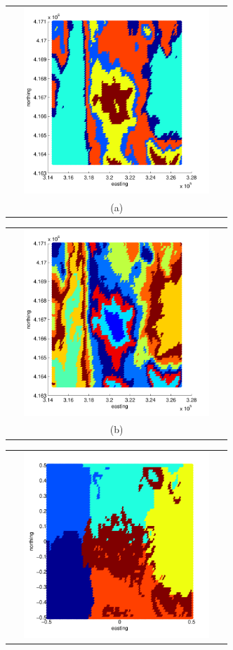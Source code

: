\documentclass[12pt,letterpaper]{article}
\begin{document}
\begin{figure}[H]
  \begin{minipage}[b]{0.5\textwidth}
    \begin{tabular}{c}
      \includegraphics[width=8cm,height=7cm,keepaspectratio]{figs/Spectral1_old.pdf}\\
      (a)
    \end{tabular}
  \end{minipage}
  \begin{minipage}{0.5\textwidth}
    \begin{tabular}{c}
      \includegraphics[width=8cm,height=7cm,keepaspectratio]{figs/T30_K10.pdf}\\
      (b)
    \end{tabular}
  \end{minipage}
  \begin{minipage}[b]{0.5\textwidth}
    \begin{tabular}{c}
      \includegraphics[width=8cm,height=7cm,keepaspectratio]{figs/Spectral2.pdf}\\

\end{tabular}
\end{minipage}
\end{figure}
\end{document}
